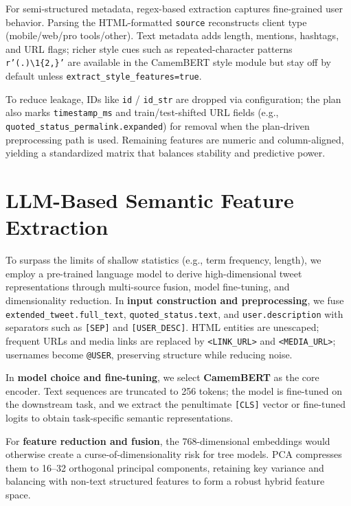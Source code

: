 \documentclass[twocolumn, a4paper, 10pt]{article}
\begin{document}
For semi-structured metadata, regex-based extraction captures fine-grained user behavior. Parsing the HTML-formatted \texttt{source} reconstructs client type (mobile/web/pro tools/other). Text metadata adds length, mentions, hashtags, and URL flags; richer style cues such as repeated-character patterns \texttt{r'(.)\textbackslash 1\{2,\}'} are available in the CamemBERT style module but stay off by default unless \texttt{extract\_style\_features=true}.

To reduce leakage, IDs like \texttt{id} / \texttt{id\_str} are dropped via configuration; the plan also marks \texttt{timestamp\_ms} and train/test-shifted URL fields (e.g., \texttt{quoted\_status\_permalink.expanded}) for removal when the plan-driven preprocessing path is used. Remaining features are numeric and column-aligned, yielding a standardized matrix that balances stability and predictive power.



\section*{LLM-Based Semantic Feature Extraction}

To surpass the limits of shallow statistics (e.g., term frequency, length), we employ a pre-trained language model to derive high-dimensional tweet representations through multi-source fusion, model fine-tuning, and dimensionality reduction. In \textbf{input construction and preprocessing}, we fuse \texttt{extended\_tweet.full\_text}, \texttt{quoted\_status.text}, and \texttt{user.description} with separators such as \texttt{[SEP]} and \texttt{[USER\_DESC]}. HTML entities are unescaped; frequent URLs and media links are replaced by \texttt{<LINK\_URL>} and \texttt{<MEDIA\_URL>}; usernames become \texttt{@USER}, preserving structure while reducing noise.

In \textbf{model choice and fine-tuning}, we select \textbf{CamemBERT} as the core encoder. Text sequences are truncated to 256 tokens; the model is fine-tuned on the downstream task, and we extract the penultimate \texttt{[CLS]} vector or fine-tuned logits to obtain task-specific semantic representations.

For \textbf{feature reduction and fusion}, the 768-dimensional embeddings would otherwise create a curse-of-dimensionality risk for tree models. PCA compresses them to 16–32 orthogonal principal components, retaining key variance and balancing with non-text structured features to form a robust hybrid feature space.
\end{document}

